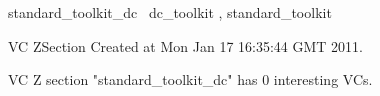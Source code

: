 \documentclass{article}
\begin{document}

\begin{zsection}
	 \SECTION standard\_toolkit\_dc \parents~dc\_toolkit , standard\_toolkit
\end{zsection}

\newcommand{\appliesTo}{\zbinop{appliesTo}} 
\newcommand{\appliesToNofix}{\zpreop{appliesToNofix}} 

VC ZSection Created at Mon Jan 17 16:35:44 GMT 2011.



 VC Z section "standard_toolkit_dc" has $0$ interesting VCs.



\end{document}
